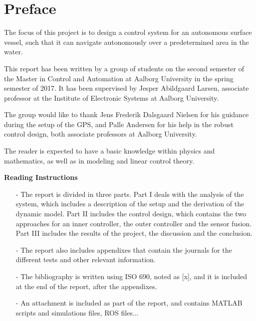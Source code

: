 \chapter*{Preface}
\vspace{-12 pt}
The focus of this project is to design a control system for an autonomous surface vessel, such that it can navigate autonomously over a predetermined area in the water.

This report has been written by a group of students on the second semester of the Master in Control and Automation at Aalborg University in the spring semester of 2017. It has been supervised by Jesper Abildgaard Larsen, associate professor at the Institute of Electronic Systems at Aalborg University. 

The group would like to thank Jens Frederik Dalsgaard Nielsen for his guidance during the setup of the GPS, and Palle Andersen for his help in the robust control design, both associate professors at Aalborg University.

The reader is expected to have a basic knowledge within physics and mathematics, as well as in modeling and linear control theory.

\textbf{Reading Instructions}
\vspace{-10 pt}
\begin{itemize}
    \item[-] The report is divided in three parts. Part I deals with the analysis of the system, which includes a description of the setup and the derivation of the dynamic model. Part II includes the control design, which contains the two approaches for an inner controller, the outer controller and the sensor fusion. Part III includes the results of the project, the discussion and the conclusion.
    \item[-] The report also includes appendixes that contain the journals for the different tests and other relevant information.
    \item[-] The bibliography is written using ISO 690, noted as [x], and it is included at the end of the report, after the appendixes.
    \item[-] An attachment is included as part of the report, and contains MATLAB scripts and simulations files, ROS files... 
\end{itemize}


